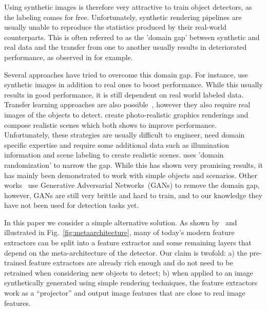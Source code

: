 \documentclass[10pt,twocolumn,letterpaper]{article}
\begin{document}
 
Using synthetic images  is therefore very attractive to  train object detectors,
as the  labeling comes for  free.  Unfortunately, synthetic  rendering pipelines
are  usually unable  to reproduce  the statistics  produced by  their real-world
counterparts.  This is  often referred to as the 'domain  gap' between synthetic
and  real  data  and  the  transfer  from one  to  another  usually  results  in
deteriorated performance, as observed in \cite{Tobin17} for example.


Several  approaches have  tried  to  overcome this  domain  gap.  For  instance,
\cite{Dwibedi17,Georgakis17,Rad17c}  use synthetic  images in  addition to  real
ones to boost  performance.  While this usually results in  good performance, it
is still dependent on real world labeled data.  Transfer learning approaches are
also possible~\cite{Rozantsev17,bousmalis2016domain,ganin2016domain}, however  they also require real  images of the
objects to  detect.  \cite{Gupta16,  Alhaija17} create  photo-realistic graphics
renderings and \cite{Gupta16, Alhaija17, Georgakis17, Varol17} compose realistic
scenes which both shows to improve performance.  Unfortunately, these strategies
are usually difficult to engineer, need domain specific expertise and require some
additional data  such as illumination  information and scene labeling  to create
realistic scenes.  \cite{Tobin17} uses 'domain randomization' to narrow the gap.
While this has shown very promising  results, it has mainly been demonstrated to
work       with      simple       objects       and      scenarios.        Other
works~\cite{Shrivastava16,Bousmalis17}      use      Generative      Adversarial
Networks~(GANs) to  remove the domain gap,  however, GANs are still very brittle
and hard to train, and to our knowledge they have not been used for detection
tasks yet.





 


In  this   paper  we   consider  a  simple   alternative  solution.    As  shown
by~\cite{Huang17}  and illustrated  in Fig.~\ref{fig:metaarchitecture},  many of
today's modern feature extractors can be split into a feature extractor and some
remaining  layers that  depend on  the meta-architecture  of the  detector.  Our
claim is twofold: a) the pre-trained  feature extractors are already rich enough
and do not need to be retrained  when considering new objects to detect; b) when
applied to an  image synthetically generated using  simple rendering techniques,
the feature  extractors work as a  ``projector'' and output image  features that
are close to real image features.
\end{document}
